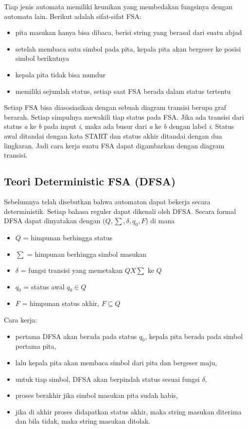 Tiap jenis automata memiliki keunikan yang membedakan fungsinya dengan automata lain. Berikut adalah sifat-sifat FSA:

\begin{itemize}
	\item pita masukan hanya bisa dibaca, berisi string yang berasal dari suatu abjad
	\item setelah membaca satu simbol pada pita, kepala pita akan bergeser ke posisi simbol berikutnya
	\item kepala pita tidak bisa mundur
	\item memiliki sejumlah status, setiap saat FSA berada dalam status tertentu
\end{itemize}

Setiap FSA bisa diasosiasikan dengan sebuah diagram transisi berupa graf berarah. Setiap simpulnya mewakili tiap status pada FSA. Jika ada transisi dari status \textit{a} ke \textit{b} pada input \textit{i}, maka ada busur dari \textit{a} ke \textit{b} dengan label \textit{i}. Status awal ditandai dengan kata START dan status akhir ditandai dengan dua lingkaran. Jadi cara kerja suatu FSA dapat digambarkan dengan diagram transisi.

\subsection{Teori Deterministic FSA (DFSA)\cite{Frisca:2014}}

Sebelumnya telah disebutkan bahwa automaton dapat bekerja secara deterministik. Setiap bahasa reguler dapat dikenali oleh DFSA. Secara formal DFSA dapat dinyatakan dengan ($Q,\sum,\delta,q_0,F$) di mana

\begin{itemize}
	\item $Q$ = himpunan berhingga status
	\item $\sum$ = himpunan berhingga simbol masukan
	\item $\delta$ = fungsi transisi yang memetakan $Q X \sum$ ke $Q$
	\item $q_0$ = status awal $q_0 \in Q$
	\item $F$ = himpunan status akhir, $F \subseteq Q$
\end{itemize}

Cara kerja:

\begin{itemize}
	\item pertama DFSA akan berada pada status $q_0$, kepala pita berada pada simbol pertama pita,
	\item lalu kepala pita akan membaca simbol dari pita dan bergeser maju,
	\item untuk tiap simbol, DFSA akan berpindah status sesuai fungsi $\delta$,
	\item proses berakhir jika simbol masukan pita sudah habis,
	\item jika di akhir proses didapatkan status akhir, maka string masukan diterima dan bila tidak, maka string masukan ditolak.
\end{itemize}

